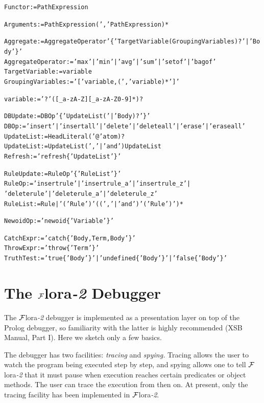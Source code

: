\documentclass[11pt]{article}
\newcommand{\FLSYSTEM}{{\mbox{\sc ${\cal F}${lora}\rm\emph{-2}}}\xspace}
\begin{document}
\begin{alltt}
Functor := PathExpression

Arguments := PathExpression (',' PathExpression)*

Aggregate := AggregateOperator '\{' TargetVariable (GroupingVariables)? '|' Body '\}'
AggregateOperator := 'max' | 'min' | 'avg' | 'sum' | 'setof' | 'bagof'
TargetVariable := variable
GroupingVariables := '[' variable, (',' variable)* ']'

variable := '?' ([_a-zA-Z][_a-zA-Z0-9]*)?

DBUpdate := DBOp '\{' UpdateList ('|' Body)? '\}'
DBOp := 'insert' | 'insertall' | 'delete' | 'deleteall' | 'erase' | 'eraseall'
UpdateList := HeadLiteral ('@' atom)?
UpdateList := UpdateList (',' | 'and') UpdateList
Refresh := 'refresh\{' UpdateList '\}'

RuleUpdate := RuleOp '\{' RuleList '\}'
RuleOp := 'insertrule' | 'insertrule_a' | 'insertrule_z' |
               'deleterule' | 'deleterule_a' | 'deleterule_z'
RuleList := Rule | '(' Rule ')'  ( (',' | 'and')  '(' Rule ')' )*

NewoidOp := 'newoid\{' Variable '\}'

CatchExpr := 'catch\{' Body, Term, Body '\}'
ThrowExpr := 'throw\{' Term '\}'
TruthTest := 'true\{' Body '\}' | 'undefined\{' Body '\}' | 'false\{' Body '\}'
\end{alltt}


\section{The \FLSYSTEM Debugger}\label{sec-debugger}


The \FLSYSTEM debugger is implemented as a presentation layer on top of the Prolog
debugger, so familiarity with the latter is highly recommended (XSB Manual,
Part I). Here we sketch only a few basics.

The debugger has two facilities: \emph{tracing} and \emph{spying.} Tracing
allows the user to watch the program being executed step by step, and
spying allows one to tell \FLSYSTEM that it must pause when execution reaches
certain predicates or object methods. The user can trace the execution from
then on. At present, only the tracing facility has been implemented in
\FLSYSTEM.
\end{document}
